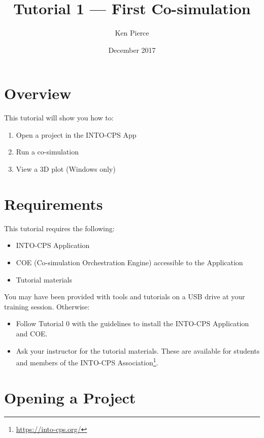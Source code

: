 \documentclass[11pt,a4paper]{../tutorial}
\title{Tutorial 1 --- First Co-simulation}
\date{December 2017}
\author{Ken Pierce}
\begin{document}
\section*{Overview}

This tutorial will show you how to:

\begin{enumerate}[noitemsep]
\item Open a project in the INTO-CPS App
\item Run a co-simulation
\item View a 3D plot (Windows only)
\end{enumerate}

\section*{Requirements}

This tutorial requires the following:
\begin{itemize}[noitemsep]
\item INTO-CPS Application
\item COE (Co-simulation Orchestration Engine) accessible to the Application
\item Tutorial materials
\end{itemize}

You may have been provided with tools and tutorials on a USB drive at your training session. Otherwise: 
\begin{itemize}[noitemsep]
\item Follow Tutorial 0 with the guidelines to install the INTO-CPS Application and COE.
\item Ask your instructor for the tutorial materials. These are available for students and members of the INTO-CPS Association\footnote{\url{https://into-cps.org/}}.
\end{itemize}




\section{Opening a Project}
\end{document}
